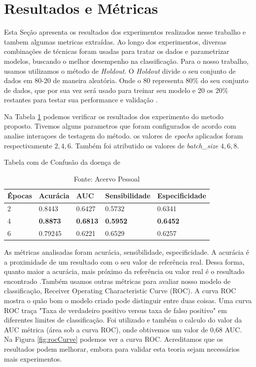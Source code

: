 \documentclass[openright]{UFRGS} %
\begin{document}
\section{Resultados e Métricas}

Esta Seção apresenta os resultados dos experimentos  realizados
nesse trabalho e tambem algumas metricas extraídas. Ao longo dos experimentos, diversas combinações de técnicas foram usadas para tratar os dados e parametrizar modelos, buscando o melhor desempenho na classificação. Para o nosso trabalho, usamos utilizamos o método de \textit{Holdout}. O \textit{Holdout}  divide o seu conjunto de dados em 80-20 de maneira aleatória. Onde o 80 representa 80\% do seu conjunto de dados, que por sua vez será usado para treinar seu modelo e 20 os 20\% restantes para testar sua performance e validação \cite{kim2009estimating}.

Na Tabela \ref{results}  podemos verificar os resultados dos experimento do metodo proposto.
Tivemos alguns parametros que foram configurados de acordo com analise interaçoes de testagem do método. os  valores de \textit{epochs} aplicados foram respectivamente  $2,4,6$. Também foi atributido os valores de  \textit{batch\_size}  $4,6,8$.



\begin{table}[h]
 \begin{center}
 \caption{Tabela com  de Confusão da doença de }
\begin{tabular}{|l|l|l|l|l|}
\hline
Épocas & Acurácia & AUC    & Sensibilidade & Especificidade \\ \hline
2     & 0.8443    &  0.6427    &  0.5732                & 0.6341                \\ \hline
4     & \textbf{0.8873}    & \textbf{0.6813} & \textbf{0.5952}        & \textbf{0.6452}         \\ \hline
6     & 0.79245   & 0.6221       &    0.6529           &     0.6257            \\ \hline
\end{tabular}
   \label{results}
\end{center}
\caption{Fonte: Acervo Pessoal}
\end{table}

As métricas analisadas foram  acurácia, sensibilidade, especificidade. A acurácia é a proximidade de um resultado com o seu valor de referência real. Dessa forma, quanto maior a acurácia, mais próximo da referência ou valor real é o resultado encontrado \cite{monico2009acuracia}
.Também usamos outras métricas para avaliar nosso modelo de classificação, Receiver Operating Characteristic Curve (ROC).
A curva ROC mostra o quão bom o modelo criado pode distinguir entre duas coisas.
Uma curva ROC traça "Taxa de verdadeiro positivo versus taxa de falso positivo"  em diferentes limites de classificação.
Foi utilizado e também o calculo do valor da AUC métrica (área sob a curva ROC), onde obtivemos um valor de
0,68 AUC. Na Figura  \ref{fig:rocCurve} podemos ver a curva ROC.
Acreditamos que os resultados podem melhorar,
embora para validar esta teoria sejam necessários mais experimentos.
\end{document}
